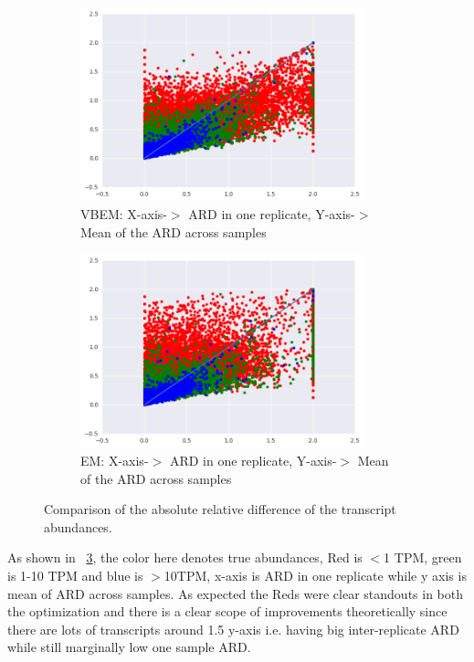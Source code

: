 \documentclass{article}
\begin{document}
\begin{figure}
  \centering
  \begin{subfigure}[t]{0.46\textwidth}
    \centering
    \includegraphics[width=0.9\textwidth]{figures/mardvb.png}
    \caption{ \label{fig:vbard} VBEM: X-axis-$>$ ARD in one replicate,  Y-axis-$>$ Mean of the ARD across samples}
  \end{subfigure}
  \qquad
  \begin{subfigure}[t]{0.46\textwidth}
    \centering
      \includegraphics[width=0.9\textwidth]{figures/mardem.png}
      \caption{\label{fig:emard} EM: X-axis-$>$ ARD in one replicate,  Y-axis-$>$ Mean of the ARD across samples}
  \end{subfigure}
  \caption{\label{fig:ard} Comparison of the absolute relative difference of the transcript abundances.}
\end{figure}


As shown in ~\cref{fig:ard}, the color here denotes true abundances, Red is $<$1 TPM, green is 1-10 TPM and blue is $>$10TPM, x-axis is ARD in one replicate while y axis is mean of ARD across samples. As expected the Reds were clear standouts in both the optimization and there is a clear scope of improvements theoretically since there are lots of transcripts around 1.5 y-axis i.e. having big inter-replicate ARD while still marginally low one sample ARD.
\end{document}
